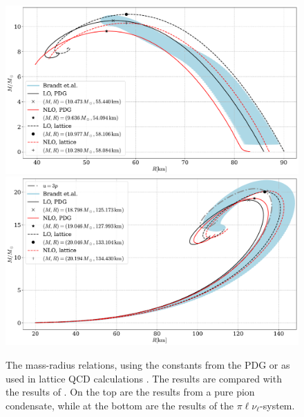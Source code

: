 \begin{figure}[p]
    \centering
    \includegraphics[width=.95\textwidth]{../scripts/figurer/pion_star/lattice_const_compare.pdf}
    \vspace{1cm}
    \includegraphics[width=.95\textwidth]{../scripts/figurer/pion_star/lattice_const_compare_neutrino.pdf}
    \caption{
        The mass-radius relations, using the constants from the PDG \autocite{particledatagroupReviewParticlePhysics2020} or as used in lattice QCD calculations \autocite{brandtNewClassCompact2018}.
    The results are compared with the results of \autocite{brandtNewClassCompact2018}.
    On the top are the results from a pure pion condensate, while at the bottom are the results of the $\pi\ell\nu_\ell$-system.
    }
    \label{fig: different constants compare}
\end{figure}
